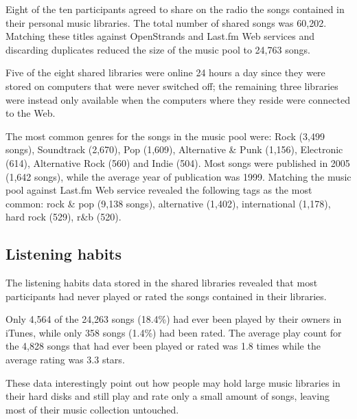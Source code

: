 Eight of the ten participants agreed to share on the radio the songs contained in their personal music libraries.
The total number of shared songs was 60,202. 
Matching these titles against OpenStrands and Last.fm Web services and discarding duplicates reduced the size of the music pool to 24,763 songs.

Five of the eight shared libraries were online 24 hours a day since they were stored on computers that were never switched off; the remaining three libraries were instead only available when the computers where they reside were connected to the Web.

The most common genres for the songs in the music pool were: Rock (3,499 songs), Soundtrack (2,670), Pop (1,609), Alternative \& Punk (1,156), Electronic (614), Alternative Rock (560) and Indie (504). 
Most songs were published in 2005 (1,642 songs), while the average year of publication was 1999.
%
Matching the music pool against Last.fm Web service revealed the following tags as the most common: rock \& pop (9,138 songs), alternative (1,402), international (1,178), hard rock (529), r\&b (520).


\subsection{Listening habits} %
\label{sub:listening_habits}

The listening habits data stored in the shared libraries revealed that most participants had never played or rated the songs contained in their libraries.

Only 4,564 of the 24,263 songs (18.4\%) had ever been played by their owners in iTunes, while only 358 songs (1.4\%) had been rated. %
The average play count for the 4,828 songs that had ever been played or rated was 1.8 times while the average rating was 3.3 stars.

These data interestingly point out how people may hold large music libraries in their hard disks and still play and rate only a small amount of songs, leaving most of their music collection untouched.



